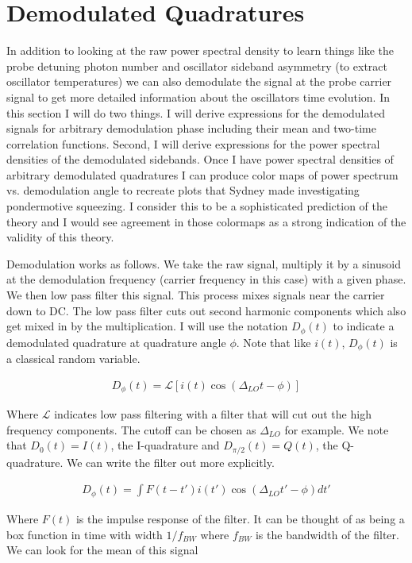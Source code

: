 \documentclass[12pt]{article}
\begin{document}
\section{Demodulated Quadratures}
In addition to looking at the raw power spectral density to learn things like the probe detuning photon number and oscillator sideband asymmetry (to extract oscillator temperatures) we can also demodulate the signal at the probe carrier signal to get more detailed information about the oscillators time evolution. In this section I will do two things. I will derive expressions for the demodulated signals for arbitrary demodulation phase including their mean and two-time correlation functions. Second, I will derive expressions for the power spectral densities of the demodulated sidebands. Once I have power spectral densities of arbitrary demodulated quadratures I can produce color maps of power spectrum vs. demodulation angle to recreate plots that Sydney made investigating pondermotive squeezing. I consider this to be a sophisticated prediction of the theory and I would see agreement in those colormaps as a strong indication of the validity of this theory.

Demodulation works as follows. We take the raw signal, multiply it by a sinusoid at the demodulation frequency (carrier frequency in this case) with a given phase. We then low pass filter this signal. This process mixes signals near the carrier down to DC. The low pass filter cuts out second harmonic components which also get mixed in by the multiplication. I will use the notation $D_{\phi}(t)$ to indicate a demodulated quadrature at quadrature angle $\phi$. Note that like $i(t)$, $D_{\phi}(t)$ is a classical random variable.

\begin{align}
D_{\phi}(t) = \mathcal{L}[i(t)\cos(\Delta_{LO}t - \phi)]
\end{align}

Where $\mathcal{L}$ indicates low pass filtering with a filter that will cut out the high frequency components. The cutoff can be chosen as $\Delta_{LO}$ for example. We note that $D_{0}(t) = I(t)$, the I-quadrature and $D_{\pi/2}(t) = Q(t)$, the Q-quadrature.
We can write the filter out more explicitly.

\begin{align}
D_{\phi}(t) = \int F(t-t')i(t')\cos(\Delta_{LO}t'-\phi)dt'
\end{align}

Where $F(t)$ is the impulse response of the filter. It can be thought of as being a box function in time with width $1/f_{BW}$ where $f_{BW}$ is the bandwidth of the filter.
We can look for the mean of this signal
\end{document}
